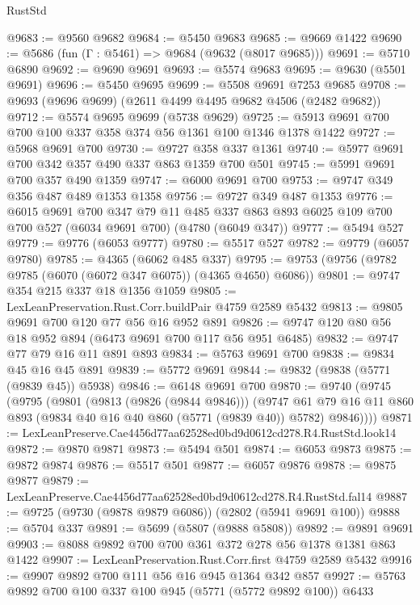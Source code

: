 \begin{lexlean}{RustStd}
\begin{coremodule}
@9683 := @9560 @9682
@9684 := @5450 @9683
@9685 := @9669 @1422
@9690 := @5686 (fun (Γ : @5461) => @9684 (@9632 (@8017 @9685)))
@9691 := @5710 @6890
@9692 := @9690 @9691
@9693 := @5574 @9683
@9695 := @9630 (@5501 @9691)
@9696 := @5450 @9695
@9699 := @5508 @9691 @7253 @9685
@9708 := @9693 (@9696 @9699) (@2611 @4499 @4495 @9682 @4506 (@2482 @9682))
@9712 := @5574 @9695 @9699 (@5738 @9629)
@9725 := @5913 @9691 @700 @700 @100 @337 @358 @374 @56 @1361 @100 @1346 @1378 @1422
@9727 := @5968 @9691 @700
@9730 := @9727 @358 @337 @1361
@9740 := @5977 @9691 @700 @342 @357 @490 @337 @863 @1359 @700 @501
@9745 := @5991 @9691 @700 @357 @490 @1359
@9747 := @6000 @9691 @700
@9753 := @9747 @349 @356 @487 @489 @1353 @1358
@9756 := @9727 @349 @487 @1353
@9776 := @6015
    @9691
    @700
    @347
    @79
    @11
    @485
    @337
    @863
    @893
    @6025
    @109
    @700
    @700
    @527
    (@6034 @9691 @700)
    (@4780 (@6049 @347))
@9777 := @5494 @527
@9779 := @9776 (@6053 @9777)
@9780 := @5517 @527
@9782 := @9779 (@6057 @9780)
@9785 := @4365 (@6062 @485 @337)
@9795 := @9753 (@9756 (@9782 @9785 (@6070 (@6072 @347 @6075)) (@4365 @4650) @6086))
@9801 := @9747 @354 @215 @337 @18 @1356 @1059
@9805 := LexLeanPreservation.Rust.Corr.buildPair @4759 @2589 @5432
@9813 := @9805 @9691 @700 @120 @77 @56 @16 @952 @891
@9826 := @9747 @120 @80 @56 @18 @952 @894 (@6473 @9691 @700 @117 @56 @951 @6485)
@9832 := @9747 @77 @79 @16 @11 @891 @893
@9834 := @5763 @9691 @700
@9838 := @9834 @45 @16 @45 @891
@9839 := @5772 @9691
@9844 := @9832 (@9838 (@5771 (@9839 @45)) @5938)
@9846 := @6148 @9691 @700
@9870 := @9740
    (@9745
      (@9795
        (@9801
          (@9813 (@9826 (@9844 @9846)))
          (@9747
            @61
            @79
            @16
            @11
            @860
            @893
            (@9834 @40 @16 @40 @860 (@5771 (@9839 @40)) @5782)
            @9846))))
@9871 := LexLeanPreserve.Cae4456d77aa62528ed0bd9d0612cd278.R4.RustStd.look14
@9872 := @9870 @9871
@9873 := @5494 @501
@9874 := @6053 @9873
@9875 := @9872 @9874
@9876 := @5517 @501
@9877 := @6057 @9876
@9878 := @9875 @9877
@9879 := LexLeanPreserve.Cae4456d77aa62528ed0bd9d0612cd278.R4.RustStd.fal14
@9887 := @9725 (@9730 (@9878 @9879 @6086)) (@2802 (@5941 @9691 @100))
@9888 := @5704 @337
@9891 := @5699 (@5807 (@9888 @5808))
@9892 := @9891 @9691
@9903 := @8088 @9892 @700 @700 @361 @372 @278 @56 @1378 @1381 @863 @1422
@9907 := LexLeanPreservation.Rust.Corr.first @4759 @2589 @5432
@9916 := @9907 @9892 @700 @111 @56 @16 @945 @1364 @342 @857
@9927 := @5763 @9892 @700 @100 @337 @100 @945 (@5771 (@5772 @9892 @100)) @6433

\end{coremodule}
\end{lexlean}
